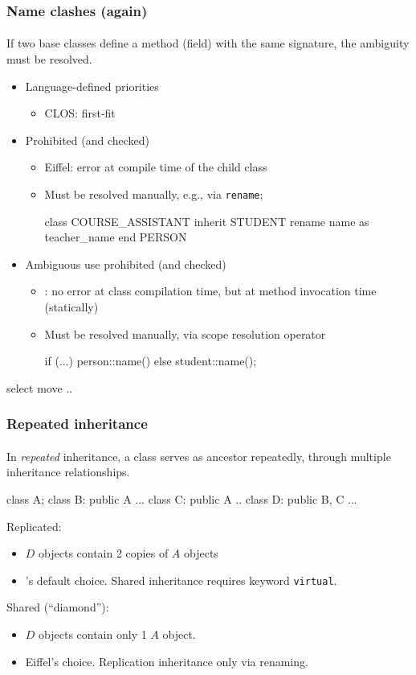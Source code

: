 \documentclass{beamer}
\begin{document}
\begin{frame}[fragile]
\frametitle{Name clashes (again)}
\framesubtitle{}
If two base classes define a method (field) with the same signature,
the ambiguity must be resolved. 

\begin{itemize}
\item Language-defined priorities
\begin{itemize}
\item CLOS: first-fit
\end{itemize}
\item Prohibited (and checked)
\begin{itemize}
\item Eiffel: error at compile time of the child class
\item Must be resolved manually, e.g., via \texttt{rename}; %
\begin{eiffel}
class COURSE_ASSISTANT
inherit
      STUDENT
          rename
              name as teacher_name
          end
      PERSON
\end{eiffel}
\end{itemize}
\item Ambiguous use prohibited (and checked)
\begin{itemize}
\item \Cpp: no error at class compilation time, but at method invocation
time (statically)
\item Must be resolved manually,  via scope resolution operator
\begin{cplus3}
if (...) person::name() else student::name(); 
\end{cplus3} 
\end{itemize}
\end{itemize}
       select 
          move ..

\end{frame}


\begin{frame}[fragile]
\frametitle{Repeated inheritance}
\framesubtitle{}
In \textit{repeated}  inheritance, a class serves as 
ancestor repeatedly, through multiple inheritance relationships. 

\begin{cplus3}
class A;
class B: public A {...}
class C: public A {.. }
class D: public B, C {...}
\end{cplus3}

Replicated: 
\begin{itemize}
\item  $D$ objects contain 2 copies of $A$ objects
\item \Cpp's default choice. Shared inheritance requires keyword \texttt{virtual}.
\end{itemize}
Shared (``diamond''): 
\begin{itemize}
\item  $D$ objects contain only 1 $A$ object.
\item Eiffel's choice. Replication inheritance only via renaming. 
\end{itemize}

\end{frame}
\end{document}
